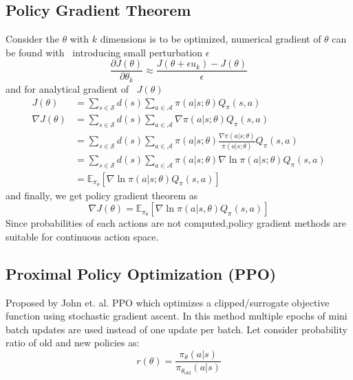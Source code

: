 \subsection{Policy Gradient Theorem}
Consider the $\displaystyle \theta $ with $\displaystyle k$ dimensions is to be optimized, numerical gradient of $\displaystyle \theta $ can be found with \ introducing small perturbation $\displaystyle \epsilon $ 
\begin{equation}
\frac{\partial J(\theta )}{\partial \theta _{k}} \approx \frac{J(\theta +\epsilon u_{k} )-J(\theta )}{\epsilon }
\end{equation}
 and for analytical gradient of \ $\displaystyle J(\theta )$
\begin{equation}
\begin{aligned}
J(\theta ) & =\sum _{s\in \mathcal{S}} d(s)\sum _{a\in \mathcal{A}} \pi (a|s;\theta )Q_{\pi } (s,a)\\
\nabla J(\theta ) & =\sum _{s\in \mathcal{S}} d(s)\sum _{a\in \mathcal{A}} \nabla \pi (a|s;\theta )Q_{\pi } (s,a)\\
 & =\sum _{s\in \mathcal{S}} d(s)\sum _{a\in \mathcal{A}} \pi (a|s;\theta )\frac{\nabla \pi (a|s;\theta )}{\pi (a|s;\theta )} Q_{\pi } (s,a)\\
 & =\sum _{s\in \mathcal{S}} d(s)\sum _{a\in \mathcal{A}} \pi (a|s;\theta )\nabla \ln \pi (a|s;\theta )Q_{\pi } (s,a)\\
 & =\mathbb{E}_{\pi _{\theta }} [\nabla \ln \pi (a|s;\theta )Q_{\pi } (s,a)]
\end{aligned}
\end{equation}
and finally, we get policy gradient theorem as
\begin{equation}
\nabla J(\theta )=\mathbb{E}_{\pi _{\theta }} [\nabla \ln \pi (a|s,\theta )Q_{\pi } (s,a)]
\end{equation}
Since probabilities of each actions are not computed,policy gradient methods are suitable for continuous action space.

\subsection{Proximal Policy Optimization (PPO)}
Proposed by John et. al. PPO\cite{schulman2017proximal} which optimizes a clipped/surrogate objective function using stochastic gradient ascent. In this method multiple epochs of mini batch updates are used instead of one update per batch. Let consider probability ratio of old and new policies as:
\begin{equation}
r(\theta )=\frac{\pi _{\theta } (a|s)}{\pi _{\theta _{\text{old}}} (a|s)}
\end{equation}

